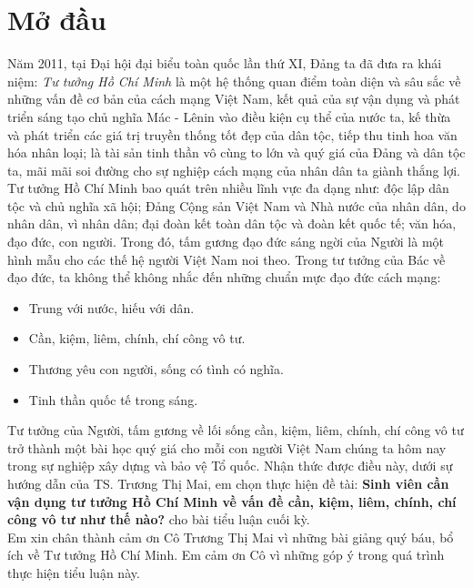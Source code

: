 \section{Mở đầu}
Năm 2011, tại Đại hội đại biểu toàn quốc lần thứ XI, Đảng ta đã đưa ra khái niệm: \textit{Tư tưởng Hồ Chí Minh} là một hệ thống quan điểm toàn diện và sâu sắc về những vấn đề cơ bản của cách mạng Việt Nam, kết quả của sự vận dụng và phát triển sáng tạo chủ nghĩa Mác - Lênin vào điều kiện cụ thể của nước ta, kế thừa và phát triển các giá trị truyền thống tốt đẹp của dân tộc, tiếp thu tinh hoa văn hóa nhân loại; là tài sản tinh thần vô cùng to lớn và quý giá của Đảng và dân tộc ta, mãi mãi soi đường cho sự nghiệp cách mạng của nhân dân ta giành thắng lợi. \cite{syllabus} \cite{vankienXI} \\
Tư tưởng Hồ Chí Minh bao quát trên nhiều lĩnh vực đa dạng như: độc lập dân tộc và chủ nghĩa xã hội; Đảng Cộng sản Việt Nam và Nhà nước của nhân dân, do nhân dân, vì nhân dân; đại đoàn kết toàn dân tộc và đoàn kết quốc tế; văn hóa, đạo đức, con người. Trong đó, tấm gương đạo đức sáng ngời của Người là một hình mẫu cho các thế hệ người Việt Nam noi theo. Trong tư tưởng của Bác về đạo đức, ta không thể không nhắc đến những chuẩn mực đạo đức cách mạng:
\begin{itemize}
\item Trung với nước, hiếu với dân.
\item Cần, kiệm, liêm, chính, chí công vô tư.
\item Thương yêu con người, sống có tình có nghĩa.
\item Tinh thần quốc tế trong sáng.
\end{itemize}
Tư tưởng của Người, tấm gương về lối sống cần, kiệm, liêm, chính, chí công vô tư trở thành một bài học quý giá cho mỗi con người Việt Nam chúng ta hôm nay trong sự nghiệp xây dựng và bảo vệ Tổ quốc. Nhận thức được điều này, dưới sự hướng dẫn của TS. Trương Thị Mai, em chọn thực hiện đề tài: \textbf{Sinh viên cần vận dụng tư tưởng Hồ Chí Minh về vấn đề cần, kiệm, liêm, chính, chí công vô tư như thế nào?} cho bài tiểu luận cuối kỳ.\\
Em xin chân thành cảm ơn Cô Trương Thị Mai vì những bài giảng quý báu, bổ ích về Tư tưởng Hồ Chí Minh. Em cảm ơn Cô vì những góp ý trong quá trình thực hiện tiểu luận này.
